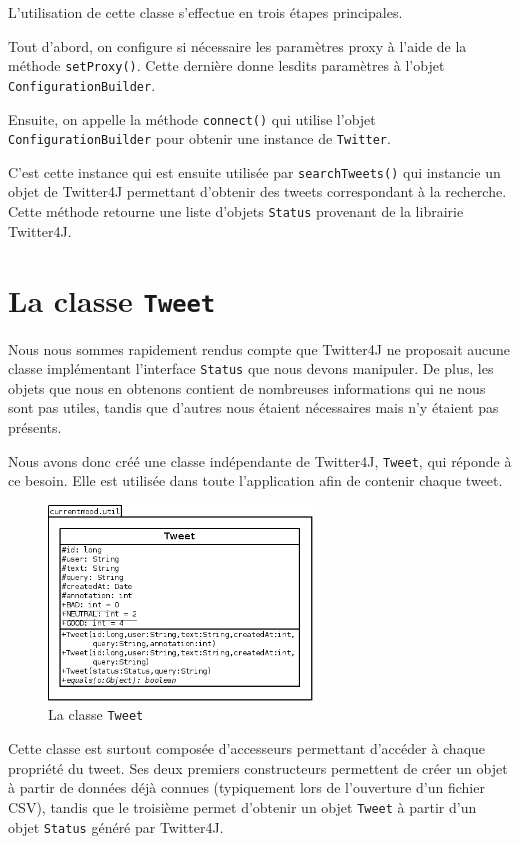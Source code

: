 \documentclass[12pt,a4paper]{report}
\begin{document}
L'utilisation de cette classe s'effectue en trois étapes principales.

Tout d'abord, on configure si nécessaire les paramètres proxy à l'aide de la
méthode \texttt{setProxy()}. Cette dernière donne lesdits paramètres à l'objet
\texttt{ConfigurationBuilder}.

Ensuite, on appelle la méthode \texttt{connect()} qui utilise l'objet
\texttt{ConfigurationBuilder} pour obtenir une instance de \texttt{Twitter}.

C'est cette instance qui est ensuite utilisée par \texttt{searchTweets()} qui
instancie un objet de Twitter4J permettant d'obtenir des tweets correspondant
à la recherche. Cette méthode retourne une liste d'objets \texttt{Status}
provenant de la librairie Twitter4J.

\section{La classe \texttt{Tweet}}

Nous nous sommes rapidement rendus compte que Twitter4J ne proposait aucune
classe implémentant l'interface \texttt{Status} que nous devons manipuler. De
plus, les objets que nous en obtenons contient de nombreuses informations qui ne
nous sont pas utiles, tandis que d'autres nous étaient nécessaires mais
n'y étaient pas présents.

Nous avons donc créé une classe indépendante de Twitter4J, \texttt{Tweet}, qui
réponde à ce besoin. Elle est utilisée dans toute l'application afin de contenir
chaque tweet.

\begin{figure}[h]
	\centering
	\includegraphics[width=7cm]{img/uml_tweet.png}
	\caption{La classe \texttt{Tweet}}
	\label{uml_tweet}
\end{figure}

Cette classe est surtout composée d'accesseurs permettant d'accéder à chaque
propriété du tweet. Ses deux premiers constructeurs permettent de créer un objet
à partir de données déjà connues (typiquement lors de l'ouverture d'un fichier
CSV), tandis que le troisième permet d'obtenir un objet \texttt{Tweet} à partir
d'un objet \texttt{Status} généré par Twitter4J.
\end{document}
